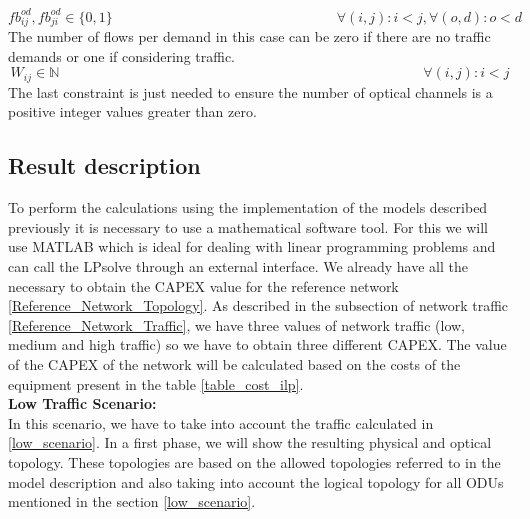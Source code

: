 \begin{equation}
fb_{ij}^{od} , fb_{ji}^{od} \in \{0,1\}   \qquad \qquad \qquad \qquad \qquad \qquad \qquad \qquad
\forall(i,j) : i < j, \forall(o,d) : o < d
\label{ILPOpaque6_Surv}
\end{equation}
\noindent
The number of flows per demand in this case can be zero if there are no traffic demands or one if considering traffic.
\newpage
\begin{equation}
W_{ij} \in \mathbb{N}  \qquad \qquad \qquad \qquad \qquad \qquad \qquad \qquad \qquad \qquad \qquad \qquad \qquad
\forall(i,j) : i < j
\label{ILPOpaque7_Surv}
\end{equation}
\noindent
The last constraint is just needed to ensure the number of optical channels is a positive integer values greater than zero.\\

\subsection{Result description}

To perform the calculations using the implementation of the models described previously it is necessary to use a mathematical software tool. For this we will use MATLAB which is ideal for dealing with linear programming problems and can call the LPsolve through an external interface.
We already have all the necessary to obtain the CAPEX value for the reference network \ref{Reference_Network_Topology}. As described in the subsection of network traffic \ref{Reference_Network_Traffic}, we have three values of network traffic (low, medium and high traffic) so we have to obtain three different CAPEX.
The value of the CAPEX of the network will be calculated based on the costs of the equipment present in the table \ref{table_cost_ilp}.\\

\textbf{Low Traffic Scenario:}\\

In this scenario, we have to take into account the traffic calculated in \ref{low_scenario}. In a first phase, we will show the resulting physical and optical topology. These topologies are based on the allowed topologies referred to in the model description and also taking into account the logical topology for all ODUs mentioned in the section \ref{low_scenario}.\\

